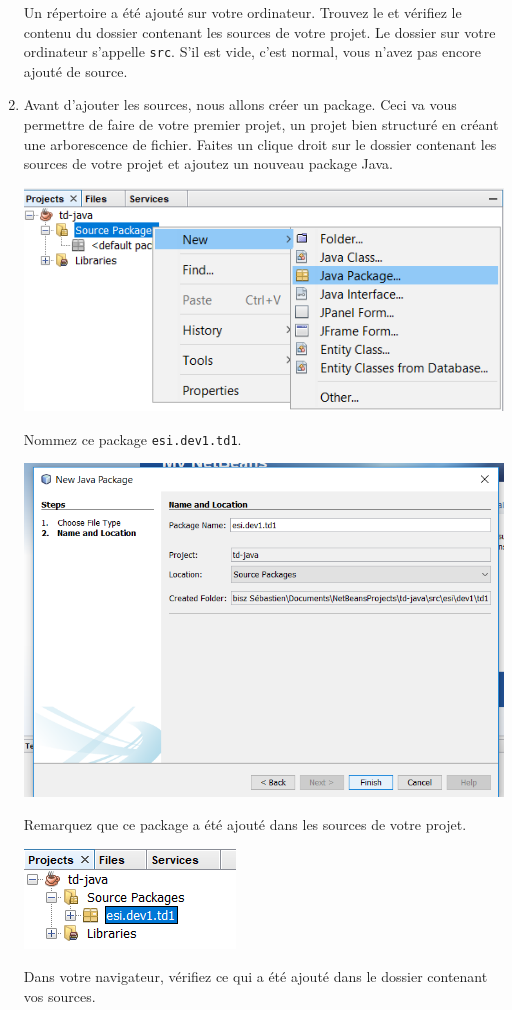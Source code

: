 \documentclass[a4paper,11pt]{article}
\begin{document}
\begin{enumerate}
		Un répertoire a été ajouté sur votre ordinateur. Trouvez le et vérifiez le contenu du dossier contenant les sources de votre projet. Le dossier sur votre ordinateur s'appelle \texttt{src}. S'il est vide, c'est normal, vous n'avez pas encore ajouté de source.


		\item Avant d'ajouter les sources, nous allons créer un package. Ceci va vous permettre de faire de votre premier projet, un projet bien structuré en créant une arborescence de fichier. Faites un clique droit sur le dossier contenant les sources de votre projet et ajoutez un nouveau package Java.
			\begin{center}
				\includegraphics[width=\textwidth]{NetBeans/nb_newproject_package}
			\end{center}

		Nommez ce package \texttt{esi.dev1.td1}.
			\begin{center}
				\includegraphics[width=\textwidth]{NetBeans/nb_newproject_package2}
			\end{center}
		Remarquez que ce package a été ajouté dans les sources de votre projet. 
			\begin{center}
				\includegraphics{NetBeans/nb_newproject_package3}
			\end{center}
		Dans votre navigateur, vérifiez ce qui a été ajouté dans le dossier contenant vos sources.



\end{enumerate}
\end{document}
